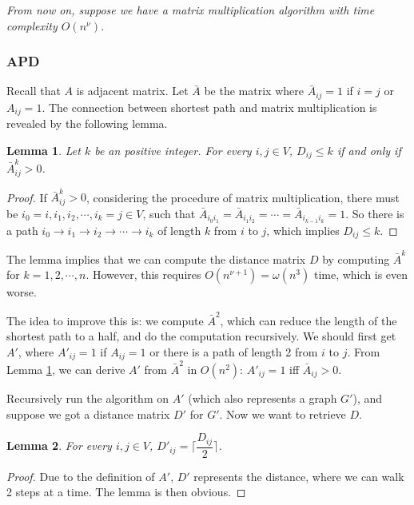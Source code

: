 \documentclass[12pt]{article}
\newtheorem{lemma}{Lemma}
\begin{document}
\emph{From now on, suppose we have a matrix multiplication algorithm with time complexity $O(n^\nu)$.}

\subsubsection{APD}
Recall that $A$ is adjacent matrix. Let $\bar{A}$ be the matrix where $\bar{A}_{ij}=1$ if $i=j$ or $A_{ij}=1$. The connection between shortest path and matrix multiplication is revealed by the following lemma.
\begin{lemma}
    \label{lemma:shortest_path_matrix_multiplication}
    Let $k$ be an positive integer. For every $i,j\in V$, $D_{ij}\le k$ if and only if $\bar{A}^k_{ij}>0$.
\end{lemma}
\begin{proof}
If $\bar{A}^k_{ij}>0$, considering the procedure of matrix multiplication, there must be $i_0=i,i_1,i_2,\cdots,i_k=j\in V$, such that $\bar A_{i_0i_1}=\bar A_{i_1i_2}=\cdots=\bar A_{i_{k-1}i_k}=1$. So there is a path $i_0\to i_1\to i_2\to\cdots\to i_k$ of length $k$ from $i$ to $j$, which implies $D_{ij}\le k$.
\end{proof}

The lemma implies that we can compute the distance matrix $D$ by computing $\bar{A}^k$ for $k=1,2,\cdots,n$. However, this requires $O(n^{\nu+1})=\omega(n^3)$ time, which is even worse.

The idea to improve this is: we compute $\bar A^2$, which can reduce the length of the shortest path to a half, and do the computation recursively. We should first get $A'$, where $A'_{ij}=1$ if $A_{ij}=1$ or there is a path of length 2 from $i$ to $j$. From Lemma \ref{lemma:shortest_path_matrix_multiplication}, we can derive $A'$ from $\bar A^2$ in $O(n^2)$: $A'_{ij}=1$ iff $\bar A_{ij}>0$.

Recursively run the algorithm on $A'$ (which also represents a graph $G'$), and suppose we got a distance matrix $D'$ for $G'$. Now we want to retrieve $D$.

\begin{lemma}
\label{2}
For every $i,j\in V$, $D'_{ij}=\lceil\dfrac{D_{ij}}{2}\rceil$.
\end{lemma}
\begin{proof}
Due to the definition of $A'$, $D'$ represents the distance, where we can walk 2 steps at a time. The lemma is then obvious.
\end{proof}
\end{document}
